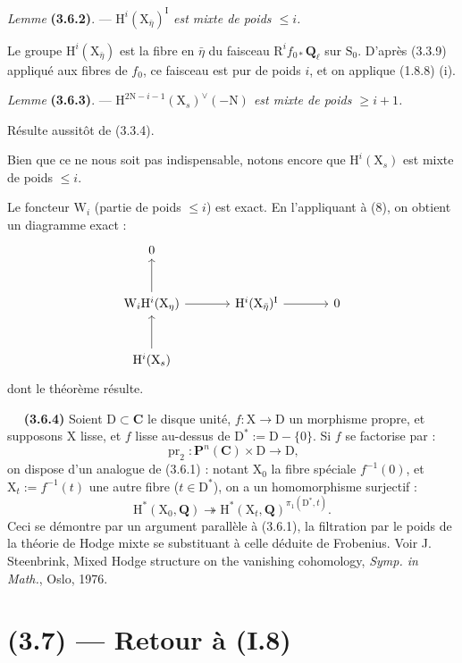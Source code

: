 \documentclass[11pt,leqno]{article}
\newcommand{\Page}[1]{\ifvmode\noindent\else\unskip\ \fi{\footnotesize\textcolor{gray}{[p.\,#1]}}\ \ignorespaces}
\begin{document}
\textit{Lemme} \textbf{(3.6.2)}. — \textit{\(\mathrm H^i(\mathrm X_{\bar\eta})^{\mathrm I}\) est mixte de poids \(\leq i\).}

Le groupe \(\mathrm H^i(\mathrm X_{\bar\eta})\) est la fibre en \(\bar\eta\) du faisceau \(\mathrm R^if_{0*}\mathbf Q_\ell\) sur \(\mathrm S_0\). D’après (3.3.9) appliqué aux fibres de \(f_0\), ce faisceau est pur de poids \(i\), et on applique (1.8.8) (i).

\textit{Lemme} \textbf{(3.6.3)}. — \textit{\(\mathrm H^{2\mathrm N-i-1}(\mathrm X_s)^{\vee}(-\mathrm N)\) est mixte de poids \(\geq i+1\).}

Résulte aussitôt de (3.3.4).

Bien que ce ne nous soit pas indispensable, notons encore que \(\mathrm H^i(\mathrm X_s)\) est mixte de poids \(\leq i\).

Le foncteur \(\mathrm W_i\) (partie de poids \(\leq i\)) est exact. En l’appliquant à (8), on obtient un diagramme exact :
\[
\begin{tikzcd}[column sep=large,row sep=large]
0 & & \\
\mathrm W_i\mathrm H^i(\mathrm X_\eta) \arrow[u] \arrow[r] &
\mathrm H^i(\mathrm X_{\bar\eta})^{\mathrm I} \arrow[r] & 0 \\
\mathrm H^i(\mathrm X_s) \arrow[u] & &
\end{tikzcd}
\]
dont le théorème résulte.

\Page{215}
\textbf{(3.6.4)} Soient \(\mathrm D\subset\mathbf C\) le disque unité, \(f:\mathrm X\to\mathrm D\) un morphisme propre, et supposons \(\mathrm X\) lisse, et \(f\) lisse au-dessus de \(\mathrm D^*:=\mathrm D-\{0\}\). Si \(f\) se factorise par :
\[
\operatorname{pr}_2:\mathbf P^n(\mathbf C)\times\mathrm D\to\mathrm D,
\]
on dispose d’un analogue de (3.6.1) : notant \(\mathrm X_0\) la fibre spéciale \(f^{-1}(0)\), et \(\mathrm X_t:=f^{-1}(t)\) une autre fibre (\(t\in\mathrm D^*\)), on a un homomorphisme surjectif :
\[
\mathrm H^*(\mathrm X_0,\mathbf Q)\twoheadrightarrow
\mathrm H^*(\mathrm X_t,\mathbf Q)^{\pi_1(\mathrm D^*,t)}.
\]
Ceci se démontre par un argument parallèle à (3.6.1), la filtration par le poids de la théorie de Hodge mixte se substituant à celle déduite de Frobenius. Voir J. Steenbrink, Mixed Hodge structure on the vanishing cohomology, \textit{Symp. in Math.}, Oslo, 1976.

\section*{(3.7) — Retour à (I.8)}
\end{document}
